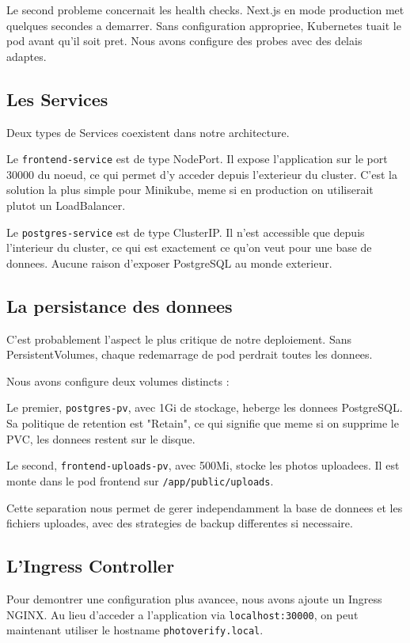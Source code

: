 \documentclass[12pt,a4paper]{article}
\begin{document}
Le second probleme concernait les health checks. Next.js en mode production met quelques secondes a demarrer. Sans configuration appropriee, Kubernetes tuait le pod avant qu'il soit pret. Nous avons configure des probes avec des delais adaptes.

\subsection{Les Services}

Deux types de Services coexistent dans notre architecture.

Le \texttt{frontend-service} est de type NodePort. Il expose l'application sur le port 30000 du noeud, ce qui permet d'y acceder depuis l'exterieur du cluster. C'est la solution la plus simple pour Minikube, meme si en production on utiliserait plutot un LoadBalancer.

Le \texttt{postgres-service} est de type ClusterIP. Il n'est accessible que depuis l'interieur du cluster, ce qui est exactement ce qu'on veut pour une base de donnees. Aucune raison d'exposer PostgreSQL au monde exterieur.

\subsection{La persistance des donnees}

C'est probablement l'aspect le plus critique de notre deploiement. Sans PersistentVolumes, chaque redemarrage de pod perdrait toutes les donnees.

Nous avons configure deux volumes distincts :

Le premier, \texttt{postgres-pv}, avec 1Gi de stockage, heberge les donnees PostgreSQL. Sa politique de retention est "Retain", ce qui signifie que meme si on supprime le PVC, les donnees restent sur le disque.

Le second, \texttt{frontend-uploads-pv}, avec 500Mi, stocke les photos uploadees. Il est monte dans le pod frontend sur \texttt{/app/public/uploads}.

Cette separation nous permet de gerer independamment la base de donnees et les fichiers uploades, avec des strategies de backup differentes si necessaire.

\subsection{L'Ingress Controller}

Pour demontrer une configuration plus avancee, nous avons ajoute un Ingress NGINX. Au lieu d'acceder a l'application via \texttt{localhost:30000}, on peut maintenant utiliser le hostname \texttt{photoverify.local}.
\end{document}
